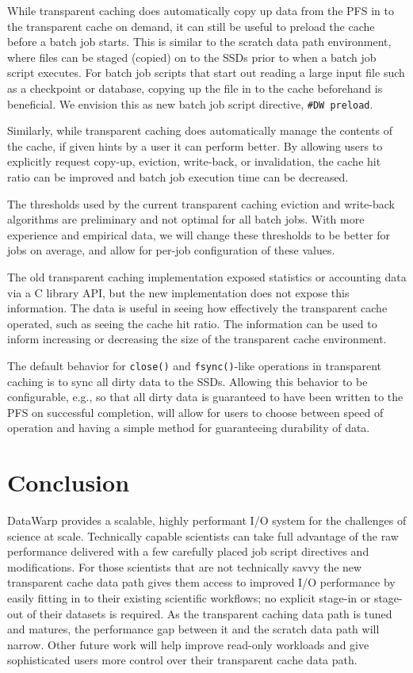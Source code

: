 \documentclass[10pt, conference, compsocconf]{IEEEtran}
\begin{document}
While transparent caching does automatically copy up data from the PFS in to the transparent cache on demand, it can still be useful to preload the cache before a batch job starts.  This is similar to the scratch data path environment, where files can be staged (copied) on to the SSDs prior to when a batch job script executes.  For batch job scripts that start out reading a large input file such as a checkpoint or database, copying up the file in to the cache beforehand is beneficial.  We envision this as new batch job script directive, \texttt{\#DW preload}.

Similarly, while transparent caching does automatically manage the contents of the cache, if given hints by a user it can perform better.  By allowing users to explicitly request copy-up, eviction, write-back, or invalidation, the cache hit ratio can be improved and batch job execution time can be decreased.

The thresholds used by the current transparent caching eviction and write-back algorithms are preliminary and not optimal for all batch jobs.  With more experience and empirical data, we will change these thresholds to be better for jobs on average, and allow for per-job configuration of these values.

The old transparent caching implementation exposed statistics or accounting data via a C library API, but the new implementation does not expose this information.  The data is useful in seeing how effectively the transparent cache operated, such as seeing the cache hit ratio.  The information can be used to inform increasing or decreasing the size of the transparent cache environment.

The default behavior for \texttt{close()} and \texttt{fsync()}-like operations in transparent caching is to sync all dirty data to the SSDs.  Allowing this behavior to be configurable, e.g., so that all dirty data is guaranteed to have been written to the PFS on successful completion, will allow for users to choose between speed of operation and having a simple method for guaranteeing durability of data.

\section{Conclusion\label{sec_conc}}
DataWarp provides a scalable, highly performant I/O system for the challenges of science at scale.  Technically capable scientists can take full advantage of the raw performance delivered with a few carefully placed job script directives and modifications.  For those scientists that are not technically savvy the new transparent cache data path gives them access to improved I/O performance by easily fitting in to their existing scientific workflows; no explicit stage-in or stage-out of their datasets is required.  As the transparent caching data path is tuned and matures, the performance gap between it and the scratch data path will narrow.  Other future work will help improve read-only workloads and give sophisticated users more control over their transparent cache data path.
\end{document}
